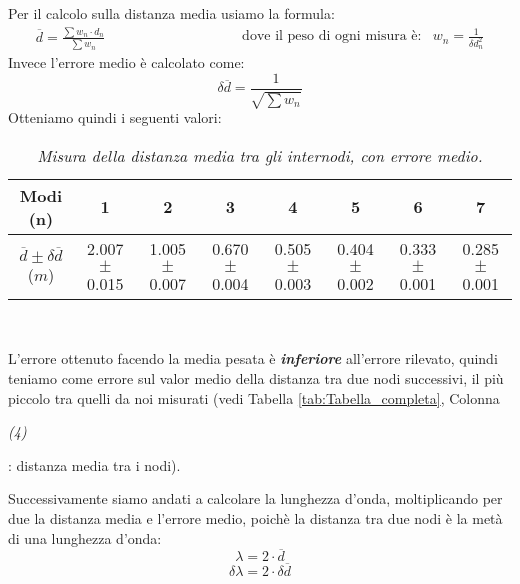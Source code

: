 \documentclass[12pt, a4paper]{article}
\begin{document}
Per il calcolo sulla distanza media usiamo la formula:
\begin{equation*}
\begin{aligned}
  &\overline{d} =\frac{\sum w_n\cdot d_n}{\sum w_n}
  &\quad{} 
  \end{aligned}
  \begin{aligned}
  & & & & & & & & &\text{dove il peso di ogni misura è:}& w_n=\frac{1}{\delta d_n^2}
  &
  \end{aligned}
\end{equation*}
Invece l'errore medio è calcolato come:
\begin{equation*}
    \delta\overline{d} =\frac{1}{\sqrt{\sum w_n}}
\end{equation*}
Otteniamo quindi i seguenti valori:
{
\renewcommand\arraystretch{1.2} %

\begin{table}[ht] %


\begin{tabular}{|c|c|c|c|c|c|c|c|} 
 
 \hline
  Modi (n) & 1 & 2 & 3 & 4 & 5 & 6 & 7\\
  
\hline

  
  $\overline{d}\pm\delta\overline{d}$ ($m$) &\footnotesize{2.007$\pm$0.015}  &\footnotesize{1.005$\pm$0.007} &\footnotesize{0.670$\pm$0.004}&\footnotesize{0.505$\pm$0.003}&\footnotesize{0.404$\pm$0.002} &\footnotesize{0.333$\pm$0.001}&\footnotesize{0.285$\pm$0.001}\\
\hline


\end{tabular}\\
\caption{\small{\textit{Misura della distanza media tra gli internodi, con errore medio.} }}
    \label{tab:Error_MediapesataFalse}
\end{table}
}
L'errore ottenuto facendo la media pesata è \textbf{\textit{inferiore}} all'errore rilevato, quindi teniamo come errore sul valor medio della distanza tra due nodi successivi, il più piccolo tra quelli da noi misurati (vedi Tabella \ref{tab:Tabella_completa}, Colonna \begin{footnotesize}{\textit{(4)}}\end{footnotesize}: distanza media tra i nodi).




Successivamente siamo andati a calcolare la lunghezza d'onda, moltiplicando per due la distanza media e l'errore medio, poichè la distanza tra due nodi è la metà di una lunghezza d'onda:
\begin{equation*}
    \lambda=2\cdot\overline{d}
\end{equation*}
\begin{equation*}
    \delta\lambda=2\cdot\delta\overline{d}
\end{equation*}
\end{document}
